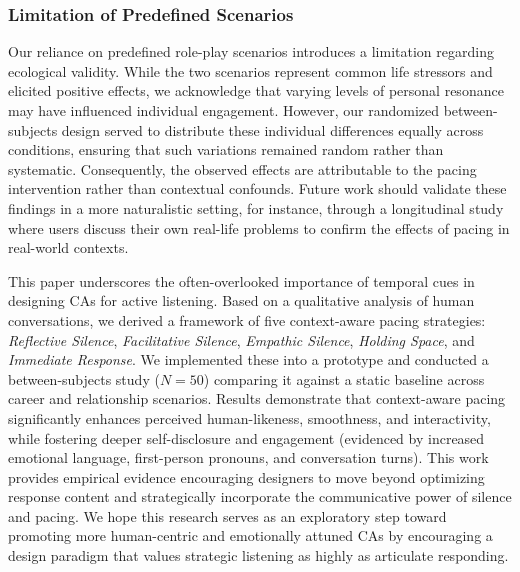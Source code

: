 \subsubsection{Limitation of Predefined Scenarios}
Our reliance on predefined role-play scenarios introduces a limitation regarding ecological validity. While the two scenarios represent common life stressors and elicited positive effects, we acknowledge that varying levels of personal resonance may have influenced individual engagement. However, our randomized between-subjects design served to distribute these individual differences equally across conditions, ensuring that such variations remained random rather than systematic. Consequently, the observed effects are attributable to the pacing intervention rather than contextual confounds. Future work should validate these findings in a more naturalistic setting, for instance, through a longitudinal study where users discuss their own real-life problems to confirm the effects of pacing in real-world contexts.

This paper underscores the often-overlooked importance of temporal cues in designing CAs for active listening. Based on a qualitative analysis of human conversations, we derived a framework of five context-aware pacing strategies: \emph{Reflective Silence}, \emph{Facilitative Silence}, \emph{Empathic Silence}, \emph{Holding Space}, and \emph{Immediate Response}. We implemented these into a prototype and conducted a between-subjects study ($N=50$) comparing it against a static baseline across career and relationship scenarios. Results demonstrate that context-aware pacing significantly enhances perceived human-likeness, smoothness, and interactivity, while fostering deeper self-disclosure and engagement (evidenced by increased emotional language, first-person pronouns, and conversation turns). This work provides empirical evidence encouraging designers to move beyond optimizing response content and strategically incorporate the communicative power of silence and pacing. We hope this research serves as an exploratory step toward promoting more human-centric and emotionally attuned CAs by encouraging a design paradigm that values strategic listening as highly as articulate responding.

\newpage
\appendix


